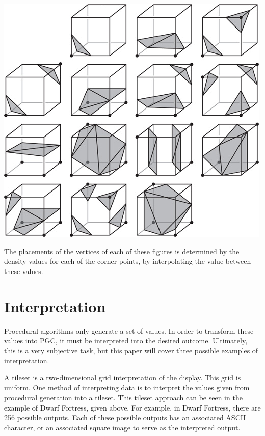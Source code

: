 \documentclass[10pt]{report}
\begin{document}
		\begin{minipage}{\textwidth}
			\centering
			\includegraphics[scale=0.75]{01fig04}
			\label{fig:01fig04}
		\end{minipage}
	
		The placements of the vertices of each of these figures is determined by the density values for each of the corner points, by interpolating the value between these values.
		
	\vspace{10pt}
	\let\clearpage\relax
	\chapter{Interpretation} \label{chap:interpret}
		
		Procedural algorithms only generate a set of values. In order to transform these values into PGC, it must be interpreted into the desired outcome. Ultimately, this is a very subjective task, but this paper will cover three possible examples of interpretation. 
		
		A tileset is a two-dimensional grid interpretation of the display. This grid is uniform. One method of interpreting data is to interpret the values given from procedural generation into a tileset. This tileset approach can be seen in the example of Dwarf Fortress, given above. For example, in Dwarf Fortress, there are 256 possible outputs. Each of these possible outputs has an associated ASCII character, or an associated square image to serve as the interpreted output. 
		
\end{document}
